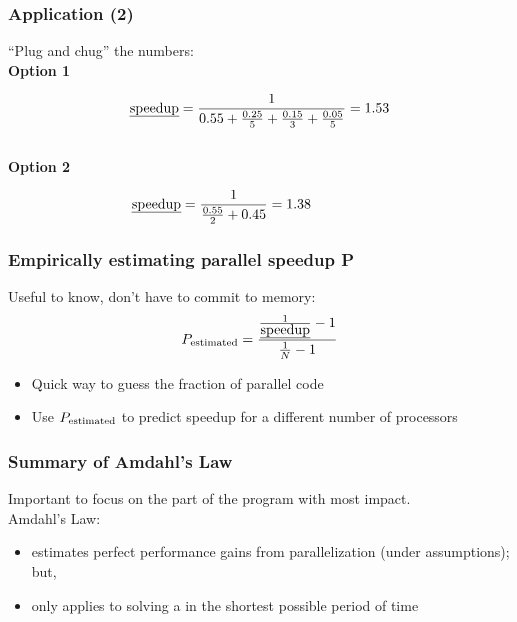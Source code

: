 \begin{frame}
  \frametitle{Application (2)}


  \hspace*{2em} ``Plug and chug'' the numbers:\\[1em]

  {\bf Option 1} \vspace*{-2em}

  \[ \mbox{\em speedup} = \frac{1}{0.55 + \frac{0.25}{5} + \frac{0.15}{3} + \frac{0.05}{5}}
    = 1.53  \]
~\\[1em]
  {\bf Option 2} \vspace*{-2em}

   \[\mbox{\em speedup} = \frac{1}{\frac{0.55}{2} + 0.45} = 1.38 \hspace*{5.5em}\]


\end{frame}

\begin{frame}
  \frametitle{Empirically estimating parallel speedup P}

  \hspace*{2em} Useful to know, don't have to commit to memory:
  \vfill
  \[P_{\mbox{\scriptsize estimated}} = \frac{\frac{1}{\mbox{\em speedup}}-1}{\frac{1}{N}-1}\]
  \vfill
  \hspace*{2em} \begin{minipage}{.8\textwidth} \begin{itemize}
    \item Quick way to guess the fraction of parallel code
    \item Use $P_{\mbox{\scriptsize estimated}}$ to predict speedup for a different number of processors
  \end{itemize} \end{minipage}
\end{frame}

\begin{frame}
  \frametitle{Summary of Amdahl's Law}

\hspace*{2em} Important to focus on the part of the program with most impact.\\[1em]

\hspace*{2em} Amdahl's Law:\\[1em]
\hspace*{2em}
  \begin{itemize}
    \item estimates perfect performance gains from
          parallelization (under assumptions); but,
    \vfill
    \item only applies to solving a  in the
          shortest possible period of time
  \end{itemize}
\end{frame}

